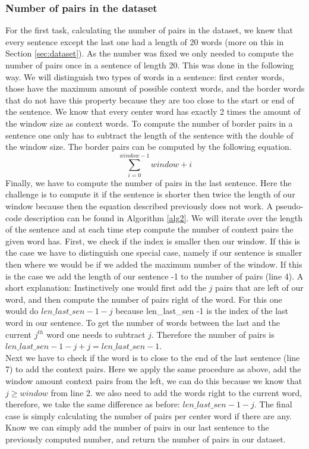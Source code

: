 \subsubsection{Number of pairs in the dataset}
For the first task, calculating the number of pairs in the dataset, we knew that every sentence except the last one had a length of 20 words (more on this in Section \ref{sec:dataset}). As the number was fixed we only needed to compute the number of pairs once in a sentence of length 20. This was done in the following way. We will distinguish two types of words in a sentence: first center words, those have the maximum amount of possible context words, and the border words that do not have this property because they are too close to the start or end of the sentence.
We know that every center word has exactly 2 times the amount of the window size as context words. To compute the number of 
border pairs in a sentence one only has to subtract the length of the sentence with the double of the window size. The border pairs can be computed by the following equation. 
\begin{equation}
\sum_{i=0}^{window -1} window + i
\end{equation}
Finally, we have to compute the number of pairs in the last sentence. Here the challenge is to compute it if the sentence is shorter then twice the length of our window because then the equation described previously does not work. A pseudo-code description can be found in Algorithm \ref{alg2}. We will iterate over the length of the sentence and at each time step compute the number of context pairs the given word has. First, we check if the index is smaller then our window. If this is the case we have to distinguish one special case, namely if our sentence is smaller then where we would be if we added the maximum number of the window. If this is the case we add the length of our sentence -1 to the number of pairs (line 4). A short explanation: Instinctively one would first add the $j$ pairs that are left of our word, and then compute the number of pairs right of the word. For this one would do $len\_last\_sen -1 -j$ because len\_last\_sen -1  is the index of the last word in our sentence. To get the number of words between the last and the current $j^{th}$ word one needs to subtract $j$. Therefore the number of pairs is $len\_last\_sen -1 -j + j = len\_last\_sen -1$.\\ Next we have to check if the word is to close to the end of the last sentence (line 7) to add the context pairs. Here we apply the same procedure as above, add the window amount context pairs from the left, we can do this because we know that $j \geq window$ from line 2. we also need to add the words right to the current word, therefore, we take the same difference as before: $len\_last\_sen -1 -j$.
The final case is simply calculating the number of pairs per center word if there are any. \\
Know we can simply add the number of pairs in our last sentence to the previously computed number, and return the number of pairs in our dataset.

